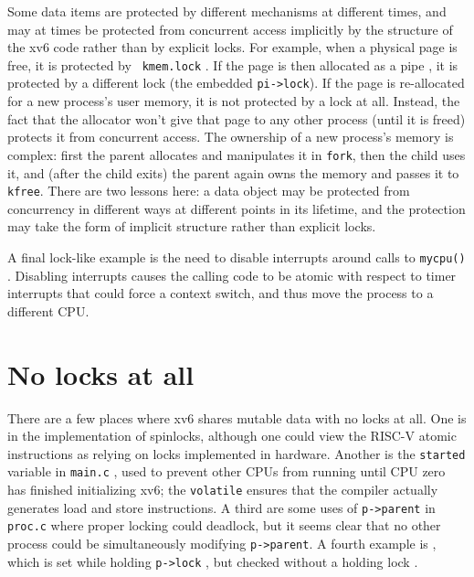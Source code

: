 Some data items are protected by different mechanisms at different
times, and may at times be protected from concurrent access implicitly
by the structure of the xv6 code rather than by explicit locks. For
example, when a physical page is free, it is protected by \texttt{
  kmem.lock} . If the page is then
allocated as a pipe , it is
protected by a different lock (the embedded \lstinline{pi->lock}). If the page
is re-allocated for a new process's user memory, it is not protected by a
lock at all. Instead, the fact that the allocator won't give that page
to any other process (until it is freed) protects it from concurrent
access. 
The ownership of a new process's memory is complex:
first the parent allocates and
manipulates it in {\tt fork}, then the child uses it, and (after the
child exits) the parent again owns the memory and passes it to {\tt
  kfree}. There are two lessons here: a data object may be protected
from concurrency in different ways at different points in its
lifetime, and the protection may take the form of implicit structure
rather than explicit locks.

A final lock-like example is the need to disable interrupts around
calls to {\tt mycpu()} . Disabling
interrupts causes the calling code to be atomic with respect to timer
interrupts that could force a context switch, and thus move the
process to a different CPU.

\section{No locks at all}

There are a few places where xv6 shares mutable data with no locks at
all. One is in the implementation of spinlocks, although one could
view the RISC-V atomic instructions as relying on locks implemented in
hardware. Another is the {\tt started} variable in {\tt main.c}
, used to prevent other CPUs from
running until CPU zero has finished initializing xv6;
the {\tt volatile} ensures that the compiler actually generates
load and store instructions.
A third are some uses of {\tt p->parent} in {\tt proc.c}
 
where proper locking could deadlock, but it seems clear that
no other process could be simultaneously modifying {\tt p->parent}.
A fourth example is , which is set while holding
\texttt{p->lock} ,
but checked without a holding lock .

